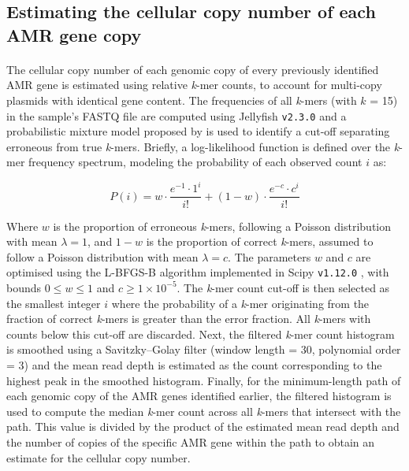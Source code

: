 \subsection*{Estimating the cellular copy number of each AMR gene copy}
\paragraph{}
The cellular copy number of each genomic copy of every previously identified AMR gene is estimated using relative \textit{k}-mer counts, to account for multi-copy plasmids with identical gene content. The frequencies of all \textit{k}-mers (with $k$ = 15) in the sample’s FASTQ file are computed using Jellyfish \texttt{v2.3.0} \cite{10.1093/bioinformatics/btr011} and a probabilistic mixture model proposed by \cite{10.1101/gr.279449.124} is used to identify a cut-off separating erroneous from true \textit{k}-mers. Briefly, a log-likelihood function is defined over the \textit{k}-mer frequency spectrum, modeling the probability of each observed count $i$ as:

\[
P(i) = w \cdot \frac{e^{-1} \cdot 1^i}{i!}  + (1 - w) \cdot \frac{e^{-c} \cdot c^i}{i!}
\]

Where $w$ is the proportion of erroneous \textit{k}-mers, following a Poisson distribution with mean $\lambda = 1$, and $1-w$ is the proportion of correct \textit{k}-mers, assumed to follow a Poisson distribution with mean $\lambda = c$. The parameters $w$ and $c$ are optimised using the L-BFGS-B algorithm implemented in Scipy \texttt{v1.12.0} \cite{2020SciPy-NMeth}, with bounds $0 \le w \le 1$ and $c \ge 1 \times 10^{-5}$. The \textit{k}-mer count cut-off is then selected as the smallest integer $i$ where the probability of a \textit{k}-mer originating from the fraction of correct \textit{k}-mers is greater than the error fraction. All \textit{k}-mers with counts below this cut-off are discarded. Next, the filtered \textit{k}-mer count histogram is smoothed using a Savitzky–Golay filter (window length = 30, polynomial order = 3) and the mean read depth is estimated as the count corresponding to the highest peak in the smoothed histogram. Finally, for the minimum-length path of each genomic copy of the AMR genes identified earlier, the filtered histogram is used to compute the median \textit{k}-mer count across all \textit{k}-mers that intersect with the path. This value is divided by the product of the estimated mean read depth and the number of copies of the specific AMR gene within the path to obtain an estimate for the cellular copy number.

